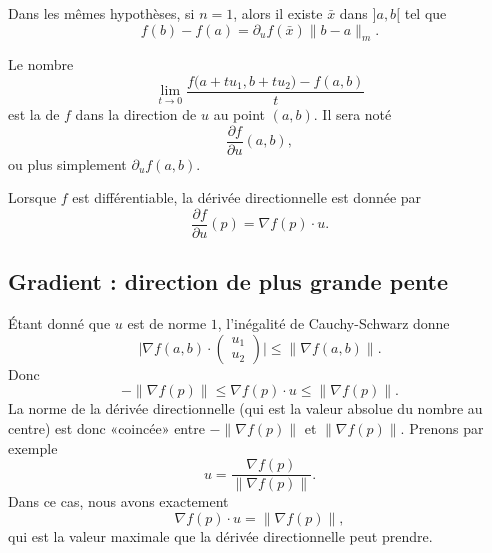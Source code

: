 \begin{corollary}
	Dans les mêmes hypothèses, si \( n=1\), alors il existe \( \bar x \) dans \( ]a,b[\) tel que
	\[
		f(b)-f(a)=\partial_uf(\bar x)\|b-a\|_m.
	\]
\end{corollary}

\begin{definition}
	Le nombre
	\begin{equation}
		\lim_{t\to 0} \frac{ f\big( a+tu_1,b+tu_2 \big)-f(a,b) }{ t }
	\end{equation}
	est la  de \( f\) dans la direction de \( u\) au point \( (a,b)\). Il sera noté
	\begin{equation}
		\frac{ \partial f }{ \partial u }(a,b),
	\end{equation}
	ou plus simplement \( \partial_uf(a,b)\).
\end{definition}

Lorsque \( f\) est différentiable, la dérivée directionnelle est donnée par
\begin{equation}        \label{EqDerDirnablau}
	\frac{ \partial f }{ \partial u }(p)=\nabla f(p)\cdot u.
\end{equation}

\subsection{Gradient : direction de plus grande pente}

Étant donné que \( u\) est de norme \( 1\), l'inégalité de Cauchy-Schwarz donne
\begin{equation}
	\big| \nabla f(a,b)\cdot \begin{pmatrix}
		u_1 \\
		u_2
	\end{pmatrix}\big|\leq \| \nabla f(a,b) \|.
\end{equation}
Donc
\begin{equation}
	-\| \nabla f(p) \|\leq \nabla f(p)\cdot u\leq\| \nabla f(p) \|.
\end{equation}
La norme de la dérivée directionnelle (qui est la valeur absolue du nombre au centre) est donc «coincée» entre \( -\| \nabla f(p) \|\) et \( \| \nabla f(p) \|\). Prenons par exemple
\begin{equation}
	u=\frac{ \nabla f(p) }{ \| \nabla f(p) \| }.
\end{equation}
Dans ce cas, nous avons exactement
\begin{equation}
	\nabla f(p)\cdot u=\| \nabla f(p) \|,
\end{equation}
qui est la valeur maximale que la dérivée directionnelle peut prendre.

